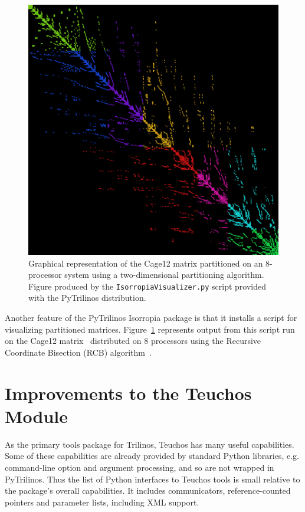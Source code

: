 \documentclass[11pt]{article}
\begin{document}
\begin{figure}
  \begin{center}
    \includegraphics[width=6.5in]{cage12rcb8}
    \caption{Graphical representation of the Cage12 matrix partitioned on an 8-processor system using a two-dimensional partitioning algorithm.  Figure produced by the {\tt IsorropiaVisualizer.py} script provided with the PyTrilinos distribution.}
    \label{fig:cage12rcb8}
  \end{center}
\end{figure}

Another feature of the PyTrilinos Isorropia package is that it installs a script for visualizing partitioned matrices.  Figure~\ref{fig:cage12rcb8} represents output from this script run on the Cage12 matrix~\cite{Cage12} distributed on 8 processors using the Recursive Coordinate Bisection (RCB) algorithm~\cite{RCB}.

\section{Improvements to the Teuchos Module}
\label{sec:teuchos}

As the primary tools package for Trilinos, Teuchos has many useful capabilities.  Some of these capabilities are already provided by standard Python libraries, e.g. command-line option and argument processing, and so are not wrapped in PyTrilinos.  Thus the list of Python interfaces to Teuchos tools is small relative to the package's overall capabilities.  It includes communicators, reference-counted pointers and parameter lists, including XML support.
\end{document}
